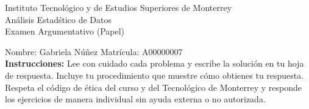 \documentclass[10pt]{report}
\begin{document}
\newpage



\begin{center}
{\large Instituto Tecnol\'{o}gico y de Estudios Superiores de Monterrey \\
An\'alisis Estad\'stico de Datos } \\
Examen Argumentativo (Papel)
\end{center}

Nombre: \underline{\hspace*{.2in}}
Gabriela Núñez
\underline{\hspace*{.2in}} \quad Matr\'icula:\underline{\hspace*{.2in}}
A00000007
\underline{\hspace*{.2in}} \\

{\bf Instrucciones:} Lee con cuidado cada problema y escribe la soluci\'on
en tu hoja de respuesta. Incluye tu procedimiento que muestre c\'omo obtienes tu respuesta.  Respeta el c\'odigo de \'etica del curso y del Tecnol\'ogico de Monterrey y responde los ejercicios de manera individual sin ayuda externa o no autorizada.
\end{document}
